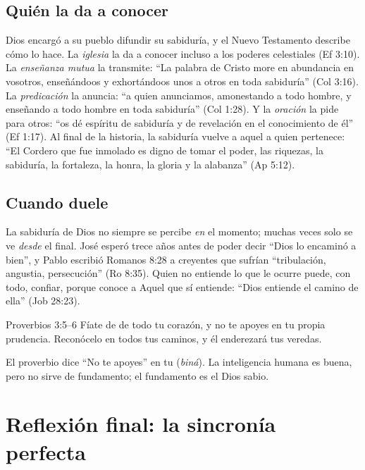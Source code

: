 \subsection{Quién la da a conocer}

Dios encargó a su pueblo difundir su sabiduría, y el Nuevo Testamento describe cómo lo hace. La \emph{iglesia} la da a conocer incluso a los poderes celestiales (Ef 3:10). La \emph{enseñanza mutua} la transmite: ``La palabra de Cristo more en abundancia en vosotros, enseñándoos y exhortándoos unos a otros en toda sabiduría'' (Col 3:16). La \emph{predicación} la anuncia: ``a quien anunciamos, amonestando a todo hombre, y enseñando a todo hombre en toda sabiduría'' (Col 1:28). Y la \emph{oración} la pide para otros: ``os dé espíritu de sabiduría y de revelación en el conocimiento de él'' (Ef 1:17). Al final de la historia, la sabiduría vuelve a aquel a quien pertenece: ``El Cordero que fue inmolado es digno de tomar el poder, las riquezas, la sabiduría, la fortaleza, la honra, la gloria y la alabanza'' (Ap 5:12).

\subsection{Cuando duele}

La sabiduría de Dios no siempre se percibe \emph{en} el momento; muchas veces solo se ve \emph{desde} el final. José esperó trece años antes de poder decir ``Dios lo encaminó a bien'', y Pablo escribió Romanos 8:28 a creyentes que sufrían ``tribulación, angustia, persecución'' (Ro 8:35). Quien no entiende lo que le ocurre puede, con todo, confiar, porque conoce a Aquel que sí entiende: ``Dios entiende el camino de ella'' (Job 28:23).

\begin{verso}{Proverbios 3:5–6}
Fíate de \SENOR{} de todo tu corazón, y no te apoyes en tu propia prudencia. Reconócelo en todos tus caminos, y él enderezará tus veredas.
\end{verso}

El proverbio dice ``No te apoyes'' en tu  (\emph{biná}). La inteligencia humana es buena, pero no sirve de fundamento; el fundamento es el Dios sabio.

\section{Reflexión final: la sincronía perfecta}

